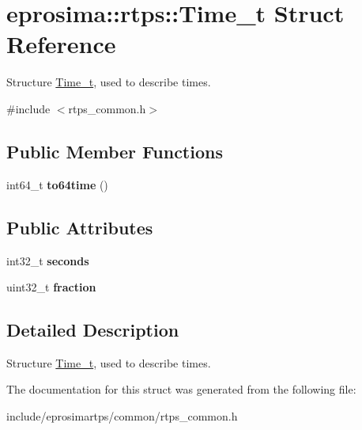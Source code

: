 \hypertarget{structeprosima_1_1rtps_1_1_time__t}{\section{eprosima\-:\-:rtps\-:\-:\-Time\-\_\-t \-Struct \-Reference}
\label{structeprosima_1_1rtps_1_1_time__t}
}


\-Structure \hyperlink{structeprosima_1_1rtps_1_1_time__t}{\-Time\-\_\-t}, used to describe times.  




{\ttfamily \#include $<$rtps\-\_\-common.\-h$>$}

\subsection*{\-Public \-Member \-Functions}
\begin{DoxyCompactItemize}
\item 
\hypertarget{structeprosima_1_1rtps_1_1_time__t_a265b78b0a3789333d41bc3dc9f3bc8fe}{int64\-\_\-t {\bfseries to64time} ()}\label{structeprosima_1_1rtps_1_1_time__t_a265b78b0a3789333d41bc3dc9f3bc8fe}

\end{DoxyCompactItemize}
\subsection*{\-Public \-Attributes}
\begin{DoxyCompactItemize}
\item 
\hypertarget{structeprosima_1_1rtps_1_1_time__t_a7b478834112c82f77b4435241910837c}{int32\-\_\-t {\bfseries seconds}}\label{structeprosima_1_1rtps_1_1_time__t_a7b478834112c82f77b4435241910837c}

\item 
\hypertarget{structeprosima_1_1rtps_1_1_time__t_a304083f2496585f6f5db6101073c33cc}{uint32\-\_\-t {\bfseries fraction}}\label{structeprosima_1_1rtps_1_1_time__t_a304083f2496585f6f5db6101073c33cc}

\end{DoxyCompactItemize}


\subsection{\-Detailed \-Description}
\-Structure \hyperlink{structeprosima_1_1rtps_1_1_time__t}{\-Time\-\_\-t}, used to describe times. 

\-The documentation for this struct was generated from the following file\-:\begin{DoxyCompactItemize}
\item 
include/eprosimartps/common/rtps\-\_\-common.\-h\end{DoxyCompactItemize}
